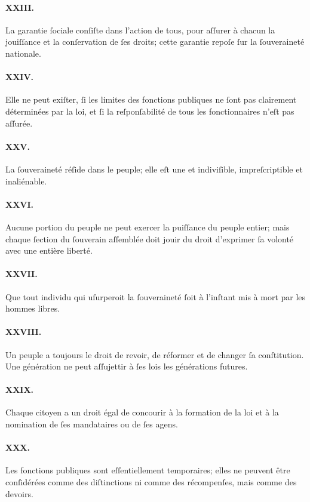 \documentclass[10pt, twoside]{lecturenotes}
\begin{document}
\paragraph*{XXIII.}La garantie ſociale conſiſte dans l'action de tous, pour aſſurer à chacun la jouiſſance et la conſervation de ſes droits; cette garantie repoſe ſur la ſouveraineté nationale.
\paragraph*{XXIV.}Elle ne peut exiſter, ſi les limites des fonctions publiques ne ſont pas clairement déterminées par la loi, et ſi la reſponſabilité de tous les fonctionnaires n'eſt pas aſſurée.
\paragraph*{XXV.}La ſouveraineté réſide dans le peuple; elle eſt une et indiviſible, impreſcriptible et inaliénable.
\paragraph*{XXVI.}Aucune portion du peuple ne peut exercer la puiſſance du peuple entier; mais chaque ſection du ſouverain aſſemblée doit jouir du droit d'exprimer ſa volonté avec une entière liberté.
\paragraph*{XXVII.}Que tout individu qui uſurperoit la ſouveraineté ſoit à l'inſtant mis à mort par les hommes libres.
\paragraph*{XXVIII.}Un peuple a toujours le droit de revoir, de réformer et de changer ſa conſtitution. Une génération ne peut aſſujettir à ſes lois les générations futures.
\paragraph*{XXIX.}Chaque citoyen a un droit égal de concourir à la formation de la loi et à la nomination de ſes mandataires ou de ſes agens.
\paragraph*{XXX.}Les fonctions publiques sont eſſentiellement temporaires; elles ne peuvent être conſidérées comme des diſtinctions ni comme des récompenſes, mais comme des devoirs.
\end{document}
